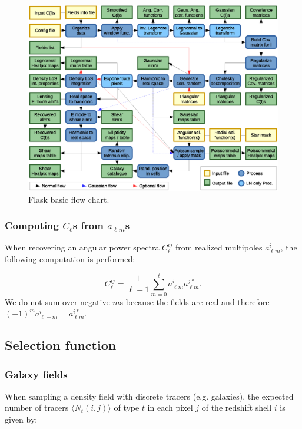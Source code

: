 \documentclass[12pt]{book} %
\begin{document}
\begin{figure}
  \includegraphics[width=1\textwidth]{flask_flow_chart.eps}
  \caption{{\sc Flask} basic flow chart.}
\label{fig:flow-chart}  
\end{figure}

\subsubsection{Computing $C_\ell$s from $a_{\ell m}$s}

When recovering an angular power spectra $C_\ell^{ij}$ from realized multipoles $a_{\ell m}^{i}$, 
the following computation is performed:

\begin{equation}
C_\ell^{ij} = \frac{1}{\ell+1}\sum_{m=0}^\ell a_{\ell m}^{i}a_{\ell m}^{j*}.
\label{eq:recov-cl}
\end{equation}
We do not sum over negative $m$s because the fields are real and therefore 
$(-1)^m a_{\ell -m}^{i} = a_{\ell m}^{i*}$.

\subsection{Selection function}
\label{sec:selection}

\subsubsection{Galaxy fields}

When sampling a density field with discrete tracers (e.g. galaxies), the expected number 
of tracers $\langle N_t(i,j) \rangle$ of type $t$ in each pixel $j$ of the redshift shell $i$ 
is given by:
\end{document}
